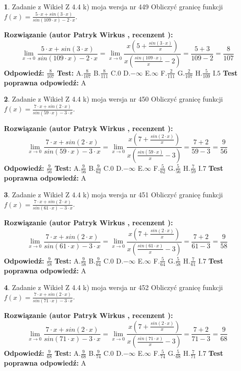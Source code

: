 \documentclass[12pt, a4paper]{article}
\theoremstyle{definition} %
\newtheorem{zad}{}
\newcommand{\zadStart}[1]{\begin{zad}#1\newline}
\newcommand{\zadStop}{\end{zad}}
\newcommand{\rozwStart}[2]{\noindent \textbf{Rozwiązanie (autor #1 , recenzent #2): }\newline}
\newcommand{\rozwStop}{\newline}
\newcommand{\odpStart}{\noindent \textbf{Odpowiedź:}\newline}
\newcommand{\odpStop}{\newline}
\newcommand{\testStart}{\noindent \textbf{Test:}\newline}
\newcommand{\testStop}{\newline}
\newcommand{\kluczStart}{\noindent \textbf{Test poprawna odpowiedź:}\newline}
\newcommand{\kluczStop}{\newline}
\begin{document}
\zadStart{Zadanie z Wikieł Z 4.4 k) moja wersja nr 449}
Obliczyć granicę funkcji $f(x)=\frac{5\cdot x +sin(3\cdot x)}{sin(109\cdot x) -2\cdot x}$.
\zadStop
\rozwStart{Patryk Wirkus}{}
$$\lim\limits_{x\to 0}\frac{5\cdot x +sin(3\cdot x)}{sin(109\cdot x) -2\cdot x}
=\lim\limits_{x\to 0}\frac{x(5+\frac{sin(3\cdot x)}{x})}{x(\frac{sin(109\cdot x)}{x}-2)}
=\frac{5+3}{109-2} = \frac{8}{107}$$
\rozwStop
\odpStart
$\frac{8}{107}$
\odpStop
\testStart
A.$\frac{8}{107}$
B.$\frac{8}{111}$
C.$0$
D.$-\infty$
E.$\infty$
F.$\frac{2}{111}$
G.$\frac{2}{107}$
H.$\frac{5}{109}$
I.$5$
\testStop
\kluczStart
A
\kluczStop



\zadStart{Zadanie z Wikieł Z 4.4 k) moja wersja nr 450}
Obliczyć granicę funkcji $f(x)=\frac{7\cdot x +sin(2\cdot x)}{sin(59\cdot x) -3\cdot x}$.
\zadStop
\rozwStart{Patryk Wirkus}{}
$$\lim\limits_{x\to 0}\frac{7\cdot x +sin(2\cdot x)}{sin(59\cdot x) -3\cdot x}
=\lim\limits_{x\to 0}\frac{x(7+\frac{sin(2\cdot x)}{x})}{x(\frac{sin(59\cdot x)}{x}-3)}
=\frac{7+2}{59-3} = \frac{9}{56}$$
\rozwStop
\odpStart
$\frac{9}{56}$
\odpStop
\testStart
A.$\frac{9}{56}$
B.$\frac{9}{62}$
C.$0$
D.$-\infty$
E.$\infty$
F.$\frac{5}{62}$
G.$\frac{5}{56}$
H.$\frac{7}{59}$
I.$7$
\testStop
\kluczStart
A
\kluczStop



\zadStart{Zadanie z Wikieł Z 4.4 k) moja wersja nr 451}
Obliczyć granicę funkcji $f(x)=\frac{7\cdot x +sin(2\cdot x)}{sin(61\cdot x) -3\cdot x}$.
\zadStop
\rozwStart{Patryk Wirkus}{}
$$\lim\limits_{x\to 0}\frac{7\cdot x +sin(2\cdot x)}{sin(61\cdot x) -3\cdot x}
=\lim\limits_{x\to 0}\frac{x(7+\frac{sin(2\cdot x)}{x})}{x(\frac{sin(61\cdot x)}{x}-3)}
=\frac{7+2}{61-3} = \frac{9}{58}$$
\rozwStop
\odpStart
$\frac{9}{58}$
\odpStop
\testStart
A.$\frac{9}{58}$
B.$\frac{9}{64}$
C.$0$
D.$-\infty$
E.$\infty$
F.$\frac{5}{64}$
G.$\frac{5}{58}$
H.$\frac{7}{61}$
I.$7$
\testStop
\kluczStart
A
\kluczStop



\zadStart{Zadanie z Wikieł Z 4.4 k) moja wersja nr 452}
Obliczyć granicę funkcji $f(x)=\frac{7\cdot x +sin(2\cdot x)}{sin(71\cdot x) -3\cdot x}$.
\zadStop
\rozwStart{Patryk Wirkus}{}
$$\lim\limits_{x\to 0}\frac{7\cdot x +sin(2\cdot x)}{sin(71\cdot x) -3\cdot x}
=\lim\limits_{x\to 0}\frac{x(7+\frac{sin(2\cdot x)}{x})}{x(\frac{sin(71\cdot x)}{x}-3)}
=\frac{7+2}{71-3} = \frac{9}{68}$$
\rozwStop
\odpStart
$\frac{9}{68}$
\odpStop
\testStart
A.$\frac{9}{68}$
B.$\frac{9}{74}$
C.$0$
D.$-\infty$
E.$\infty$
F.$\frac{5}{74}$
G.$\frac{5}{68}$
H.$\frac{7}{71}$
I.$7$
\testStop
\kluczStart
A
\kluczStop
\end{document}
